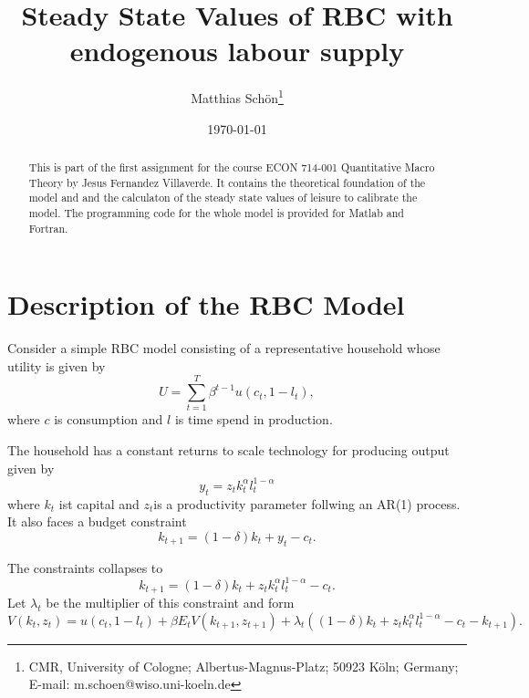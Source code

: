 \documentclass[a4paper,12pt]{article}
\begin{document}
\title{Steady State Values of RBC with endogenous labour supply}
\author{Matthias Sch\"{o}n\thanks{%
CMR, University of Cologne; Albertus-Magnus-Platz; 50923 K\"{o}ln; Germany;
E-mail: m.schoen@wiso.uni-koeln.de}}
\date{\today }
\maketitle

\begin{abstract}
This is part of the first assignment for the course ECON 714-001
Quantitative Macro Theory by Jesus Fernandez Villaverde. It contains the
theoretical foundation of the model and and the calculaton of the steady
state values of leisure to calibrate the model. The programming code for the
whole model is provided for Matlab and Fortran. 
\end{abstract}

\newpage {} \renewcommand{\thefootnote}{%
\arabic{footnote}} \setcounter{footnote}{0}

\section*{Description of the RBC Model}

Consider a simple RBC model consisting of a representative household whose
utility is given by 
\begin{equation*}
U=\sum_{t=1}^{T}\beta ^{t-1}u\left( c_{t},1-l_{t}\right) ,
\end{equation*}%
where $c$ is consumption and $l$ is time spend in production.

The household has a constant returns to scale technology for producing
output given by 
\begin{equation*}
y_{t}=z_{t}k_{t}^{\alpha }l_{t}^{1-\alpha }
\end{equation*}
where $k_{t}$ ist capital and $z_{t}$is a productivity parameter follwing an
AR(1) process. It also faces a budget constraint 
\begin{equation*}
k_{t+1}=\left( 1-\delta \right) k_{t}+y_{t}-c_{t}.
\end{equation*}

The constraints collapses to 
\begin{equation*}
k_{t+1}=\left( 1-\delta \right) k_{t}+z_{t}k_{t}^{\alpha }l_{t}^{1-\alpha
}-c_{t}.
\end{equation*}%
Let $\lambda _{t}$ be the multiplier of this constraint and form 
\begin{equation*}
V\left( k_{t},z_{t}\right) =u\left( c_{t},1-l_{t}\right) +\beta E_{t}V\left(
k_{t+1},z_{t+1}\right) +\lambda _{t}\left( \left( 1-\delta \right)
k_{t}+z_{t}k_{t}^{\alpha }l_{t}^{1-\alpha }-c_{t}-k_{t+1}\right) .
\end{equation*}
\end{document}
